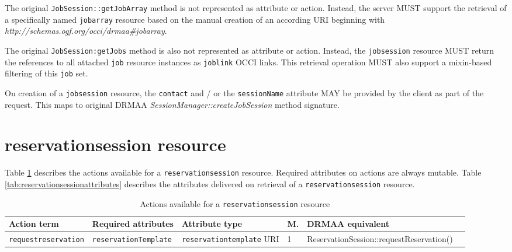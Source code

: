 \documentclass[10pt]{article}
\newcommand{\h}[1]{\lstinline|#1|}
\begin{document}

The original \h{JobSession::getJobArray} method is not represented as attribute or action. Instead, the server MUST support the retrieval of a specifically named \h{jobarray} resource based on the manual creation of an according URI beginning with \emph{http://schemas.ogf.org/occi/drmaa\#jobarray}. 

The original \h{JobSession:getJobs} method is also not represented as attribute or action. Instead, the \h{jobsession} resource MUST return the references to all attached \h{job} resource instances as \h{joblink} OCCI links. This retrieval operation MUST also support a mixin-based filtering of this \h{job} set. 

On creation of a \h{jobsession} resource, the \h{contact} and / or the \h{sessionName} attribute MAY be provided by the client as part of the request. This maps to original DRMAA \emph{SessionManager::createJobSession} method signature.


\section{reservationsession resource}

Table \ref{tab:reservationsessionactions} describes the actions available for a \h{reservationsession} resource. Required attributes on actions are always mutable. Table \ref{tab:reservationsessionattributes} describes the attributes delivered on retrieval of a \h{reservationsession} resource.

\begin{table}[ht]
\centering
\begin{tabularx}{\textwidth}{|l|l|l|l|X|l|}
\hline
Action term            & Required attributes     & Attribute type              & M. & DRMAA equivalent  \\
\hline
\h{requestreservation} & \h{reservationTemplate} & \h{reservationtemplate} URI & 1  & ReservationSession::requestReservation() \\
\hline
\end{tabularx}
\caption{Actions available for a \h{reservationsession} resource}
\label{tab:reservationsessionactions}
\end{table}
\end{document}
